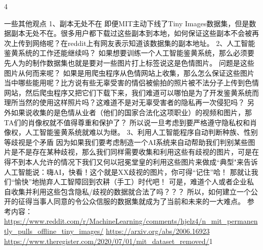 4


一些其他观点
1、副本无处不在
即便MIT主动下线了Tiny Images数据集，但是数据副本无处不在。很多用户都下载过这些副本到本地，如何保证这些副本不会被再次上传到网络呢？在reddit上有网友表示知道该数据集的副本地址。
2、人工智能鉴黄系统的工作还能继续吗？
如果想要训练一个人工智能鉴黄系统，那么必须要先人为的制作数据集也就是要对一些图片打上标签说这是色情图片。
问题是这些图片从何而来呢？
如果是用爬虫程序从色情网站上收集，那么怎么保证这些图片当中哪些能用呢？比方说有些无辜受害的情侣被偷拍的照片被不法分子上传到色情网站，然后爬虫程序又把它们下载下来，我们难道可以哪怕是为了开发鉴黄系统而理所当然的使用这样照片吗？这难道不是对无辜受害者的隐私再一次侵犯吗？
另外如果说收集的是色情从业者（他们的国家合法化这项职业）的视频和图片，那TA们的肖像权就不值得尊重和保护了？
所以说一旦考虑到要严格遵守隐私权和肖像权，人工智能鉴黄系统就难以为继。
3、利用人工智能程序自动判断种族、性别等歧视是个矛盾
因为如果我们要考虑制造一个AI系统来自动帮助我们判别某些图片是不是存在某种歧视，那么我们同样需要收集和利用这些有歧视的图片，可是在得不到本人允许的情况下我们又何以冠冕堂皇的利用这些图片来做成“典型"来告诉人工智能说：嗨AI，快看！这个就是XX歧视的图片，你可得“记住”哈！
那就让我们“愉快”地抛弃人工智障回到农耕（手工）时代吧！
可是，难道个人或者企业私自收集并利用这些包含隐私/歧视的数据就合法了吗？？？
所以，如何建立一个公开的征得当事人同意的令公众信服的数据集就成为了当前和未来的一大难点。
参考内容：
\url{https://www.reddit.com/r/MachineLearning/comments/hjelz4/n_mit_permanently_pulls_offline_tiny_images/}
\url{https://arxiv.org/abs/2006.16923}
\url{https://www.theregister.com/2020/07/01/mit_dataset_removed/}1


